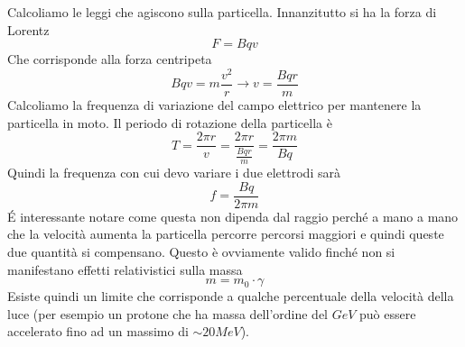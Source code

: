Calcoliamo le leggi che agiscono sulla particella.
Innanzitutto si ha la forza di Lorentz
\begin{equation}
F=Bqv
\end{equation}
Che corrisponde alla forza centripeta
\begin{equation}
Bqv=m\frac{v^2}{r}\to v=\frac{Bqr}{m}
\end{equation}
Calcoliamo la frequenza di variazione del campo elettrico per mantenere la particella in moto.
Il periodo di rotazione della particella è
\begin{equation}
T=\frac{2\pi r}{v}=\frac{2\pi r}{\frac{Bqr}{m}}=\frac{2\pi m}{Bq}
\end{equation}
Quindi la frequenza con cui devo variare i due elettrodi sarà
\begin{equation}
f=\frac{Bq}{2\pi m}
\end{equation}
\'E interessante notare come questa non dipenda dal raggio perché a mano a mano che la velocità aumenta la particella percorre percorsi maggiori e quindi queste due quantità si compensano.
Questo è ovviamente valido finché non si manifestano effetti relativistici sulla massa
\begin{equation}
m=m_0\cdot \gamma
\end{equation}
Esiste quindi un limite che corrisponde a qualche percentuale della velocità della luce (per esempio un protone che ha massa dell'ordine del $GeV$ può essere accelerato fino ad un massimo di $\sim 20MeV$).
